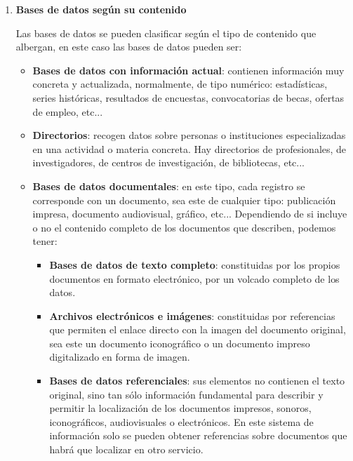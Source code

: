 \begin{enumerate}[label=(\alph*)]
    \item \textbf{Bases de datos según su contenido}

    Las bases de datos se pueden clasificar según el tipo de contenido que albergan, en este caso las bases de datos pueden ser:

    \begin{itemize}
         \item \textbf{Bases de datos con información actual}: contienen información muy concreta y actualizada, normalmente, de tipo numérico: estadísticas, series históricas, resultados de encuestas, convocatorias de becas, ofertas de empleo, etc...

         \item \textbf{Directorios}: recogen datos sobre personas o instituciones especializadas en una actividad o materia concreta. Hay directorios de profesionales, de investigadores, de centros de investigación, de bibliotecas, etc...

          \item \textbf{Bases de datos documentales}: en este tipo, cada registro se corresponde con un documento, sea este de cualquier tipo: publicación impresa, documento audiovisual, gráfico, etc... Dependiendo de si incluye o no 	el contenido completo de los documentos que describen, podemos tener:
            \begin{itemize}
                \item \textbf{Bases de datos de texto completo}: constituidas por los propios documentos en formato electrónico, por un volcado completo de los datos.

                \item \textbf{Archivos electrónicos e imágenes}: constituidas por referencias que permiten el enlace directo con la imagen del documento original, sea este un documento iconográfico o un documento impreso digitalizado en forma de imagen.

               \item \textbf{Bases de datos referenciales}: sus elementos no contienen el texto original, sino tan sólo información fundamental para describir y permitir la localización de los documentos impresos, sonoros, iconográficos, audiovisuales o electrónicos. En este sistema de información solo se pueden obtener referencias sobre documentos que habrá que localizar en otro servicio.
        \end{itemize}
    \end{itemize}


\end{enumerate}
